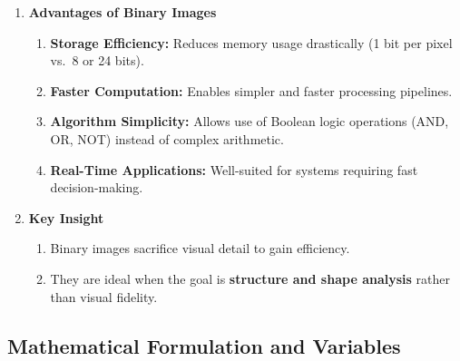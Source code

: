 \documentclass[12pt]{article}
\begin{document}
\begin{enumerate}
    \item \textbf{Advantages of Binary Images}
          \begin{enumerate}
              \item \textbf{Storage Efficiency:} Reduces memory usage drastically (1 bit per pixel vs.\ 8 or 24 bits).
              \item \textbf{Faster Computation:} Enables simpler and faster processing pipelines.
              \item \textbf{Algorithm Simplicity:} Allows use of Boolean logic operations (AND, OR, NOT) instead of complex arithmetic.
              \item \textbf{Real-Time Applications:} Well-suited for systems requiring fast decision-making.
          \end{enumerate}

    \item \textbf{Key Insight}
          \begin{enumerate}
              \item Binary images sacrifice visual detail to gain efficiency.
              \item They are ideal when the goal is \textbf{structure and shape analysis} rather than visual fidelity.
          \end{enumerate}
\end{enumerate}

\subsection{Mathematical Formulation and Variables}
\end{document}
